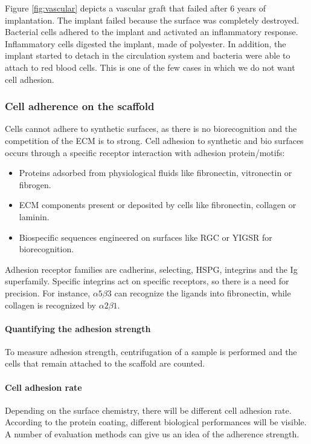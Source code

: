 			Figure \ref{fig:vascular} depicts a vascular graft that failed after 6 years of implantation.
			The implant failed because the surface was completely destroyed.
			Bacterial cells  adhered to the implant and activated an inflammatory response.
			Inflammatory cells digested the implant, made of polyester.
			In addition, the implant started to detach in the circulation system  and bacteria were able to attach to red blood cells.
			This is one of the few cases in which we do not want cell adhesion.

		\subsubsection{Cell adherence on the scaffold}
		Cells cannot adhere to synthetic surfaces, as there is no biorecognition and the competition of the ECM is to strong.
		Cell adhesion to synthetic and bio surfaces occurs through a specific receptor interaction with adhesion protein/motifs:

		\begin{multicols}{2}
			\begin{itemize}
				\item Proteins adsorbed from physiological fluids like fibronectin, vitronectin or fibrogen.
				\item ECM components present or deposited by cells like fibronectin, collagen or laminin.
				\item Biospecific sequences engineered on surfaces like RGC or YIGSR for biorecognition.
			\end{itemize}
		\end{multicols}

		Adhesion receptor families are cadherins, selecting, HSPG, integrins and the Ig superfamily.
		Specific integrins act on specific receptors, so there is a need for precision.
		For instance, $\alpha 5\beta 3$ can recognize the ligands into fibronectin, while collagen is recognized by $\alpha 2 \beta 1$.

			\paragraph{Quantifying the adhesion strength}
			To measure adhesion strength, centrifugation of a sample is performed and the cells that remain attached to the scaffold are counted.

			\paragraph{Cell adhesion rate}
			Depending on the surface chemistry, there will be different cell adhesion rate.
			According to the protein coating, different biological performances will be visible.
			A number of evaluation methods can give us an idea of the adherence strength.

